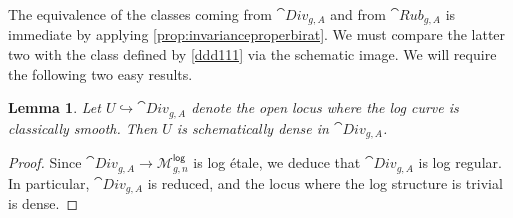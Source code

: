 \documentclass[a4paper,12pt]{article} %
\newcommand{\bb}[1]{{\mathbb{#1}}}
\newcommand{\ca}[1]{{\mathcal{#1}}}
\newcommand{\hra}{\hookrightarrow}
\theoremstyle{definition}
\theoremstyle{plain}%
\newtheorem{lemma}[definition]{Lemma}
\renewcommand{\phi}{\varphi}
\newcommand{\jocomment}[1]{}
\begin{document}
The equivalence of the classes coming from $\cat{Div}_{g,A}$ and from $\cat{Rub}_{g,A}$ is immediate by applying \cref{prop:invarianceproperbirat}. We must compare 
the latter two with the class defined by  \eqref{ddd111}
via the schematic image. We will require the following two easy results. 
\begin{lemma}\label{lem:smooth_dense}
Let $U \hra \cat{Div}_{g,A}$ denote the open locus where the log curve is classically smooth. Then $U$ is schematically dense in $\cat{Div}_{g,A}$. 
\end{lemma}
\begin{proof}
Since $\cat{Div}_{g,A} \to \ca M^{\mathsf{log}}_{g,n}$ is log \'etale, we deduce that $\cat{Div}_{g,A}$ is log regular. In particular, $\cat{Div}_{g,A}$
 is reduced,  and the locus where the log structure is trivial is dense. %
%
\end{proof}

\end{document}
